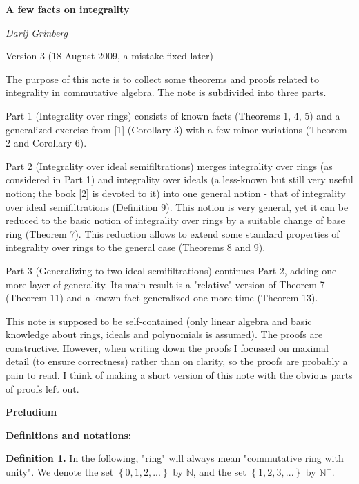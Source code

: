 \documentclass[12pt,final,notitlepage,onecolumn]{article}%
\begin{document}
\color{black}

\begin{center}
\textbf{A few facts on integrality}

\textit{Darij Grinberg}

Version 3 (18 August 2009, a mistake fixed later)
\end{center}

The purpose of this note is to collect some theorems and proofs related to
integrality in commutative algebra. The note is subdivided into three parts.

Part 1 (Integrality over rings) consists of known facts (Theorems 1, 4, 5) and
a generalized exercise from [1] (Corollary 3) with a few minor variations
(Theorem 2 and Corollary 6).

Part 2 (Integrality over ideal semifiltrations) merges integrality over rings
(as considered in Part 1) and integrality over ideals (a less-known but still
very useful notion; the book [2] is devoted to it) into one general notion -
that of integrality over ideal semifiltrations (Definition 9). This notion is
very general, yet it can be reduced to the basic notion of integrality over
rings by a suitable change of base ring (Theorem 7). This reduction allows to
extend some standard properties of integrality over rings to the general case
(Theorems 8 and 9).

Part 3 (Generalizing to two ideal semifiltrations) continues Part 2, adding
one more layer of generality. Its main result is a "relative" version of
Theorem 7 (Theorem 11) and a known fact generalized one more time (Theorem 13).

This note is supposed to be self-contained (only linear algebra and basic
knowledge about rings, ideals and polynomials is assumed). The proofs are
constructive. However, when writing down the proofs I focussed on maximal
detail (to ensure correctness) rather than on clarity, so the proofs are
probably a pain to read. I think of making a short version of this note with
the obvious parts of proofs left out.

\begin{center}
\color{blue} \textbf{Preludium} \color{black}
\end{center}

\textbf{Definitions and notations:}

\textbf{Definition 1.} In the following, "ring" will always mean "commutative
ring with unity". We denote the set $\left\{  0,1,2,...\right\}  $ by
$\mathbb{N}$, and the set $\left\{  1,2,3,...\right\}  $ by $\mathbb{N}^{+}$.
\end{document}
